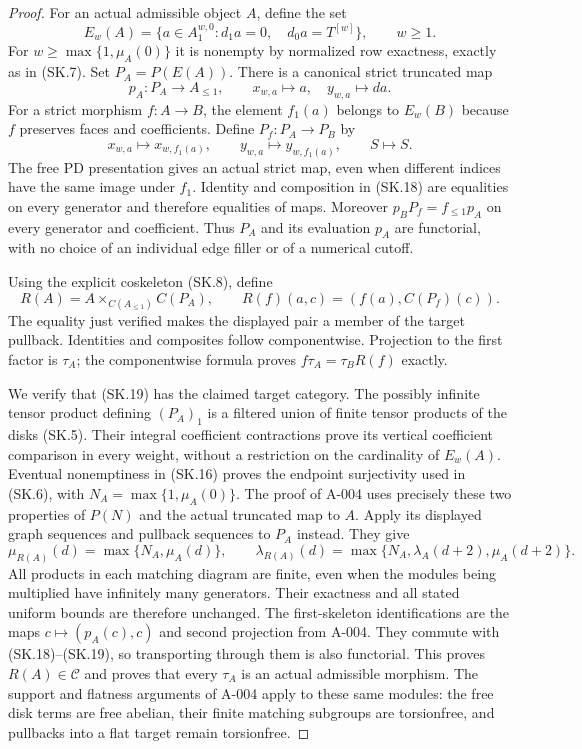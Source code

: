 \begin{proof}
For an actual admissible object $A$, define the set
\[
 E_w(A)=\{a\in A_1^{w,0}:d_1a=0,\quad d_0a=T^{[w]}\},
                    \qquad w\geq1.                              \tag{SK.16}
\]
For $w\geq\max\{1,\mu_A(0)\}$ it is nonempty by normalized
row exactness, exactly as in (SK.7).
Set $P_A=P(E(A))$. There is a canonical strict truncated map
\[
 p_A:P_A\to A_{\leq1},
             \qquad x_{w,a}\mapsto a,\quad y_{w,a}\mapsto da.
 \tag{SK.17}
\]
For a strict morphism $f:A\to B$, the element $f_1(a)$ belongs
to $E_w(B)$ because $f$ preserves faces and coefficients.
Define $P_f:P_A\to P_B$ by
\[
             x_{w,a}\mapsto x_{w,f_1(a)},\qquad
             y_{w,a}\mapsto y_{w,f_1(a)},\qquad S\mapsto S.
 \tag{SK.18}
\]
The free PD presentation gives an actual strict map, even when
different indices have the same image under $f_1$.
Identity and composition in (SK.18) are equalities on every
generator and therefore equalities of maps. Moreover
$p_BP_f=f_{\leq1}p_A$ on every generator and coefficient.
Thus $P_A$ and its evaluation $p_A$ are functorial, with no
choice of an individual edge filler or of a numerical cutoff.

Using the explicit coskeleton (SK.8), define
\[
            R(A)=A\mathop{\times}_{C(A_{\leq1})}C(P_A),
       \qquad R(f)(a,c)=(f(a),C(P_f)(c)).                         \tag{SK.19}
\]
The equality just verified makes the displayed pair a member of
the target pullback. Identities and composites follow componentwise.
Projection to the first factor is $\tau_A$; the componentwise
formula proves $f\tau_A=\tau_BR(f)$ exactly.

We verify that (SK.19) has the claimed target category. The
possibly infinite tensor product defining $(P_A)_1$ is a filtered
union of finite tensor products of the disks (SK.5).
Their integral coefficient contractions prove its vertical
coefficient comparison in every weight, without a restriction
on the cardinality of $E_w(A)$.
Eventual nonemptiness in (SK.16) proves the endpoint surjectivity
used in (SK.6), with $N_A=\max\{1,\mu_A(0)\}$.
The proof of A-004 uses precisely these two properties of $P(N)$
and the actual truncated map to $A$. Apply its displayed graph
sequences and pullback sequences to $P_A$ instead. They give
\[
 \mu_{R(A)}(d)=\max\{N_A,\mu_A(d)\},\qquad
 \lambda_{R(A)}(d)=\max\{N_A,\lambda_A(d+2),\mu_A(d+2)\}.
 \tag{SK.20}
\]
All products in each matching diagram are finite, even when
the modules being multiplied have infinitely many generators.
Their exactness and all stated uniform bounds are therefore
unchanged. The first-skeleton identifications are the maps
$c\mapsto(p_A(c),c)$ and second projection from A-004.
They commute with (SK.18)--(SK.19), so transporting through them
is also functorial. This proves $R(A)\in\mathcal C$ and proves
that every $\tau_A$ is an actual admissible morphism.
The support and flatness arguments of A-004 apply to these same
modules: the free disk terms are free abelian, their finite
matching subgroups are torsionfree, and pullbacks into a flat
target remain torsionfree.


\end{proof}
